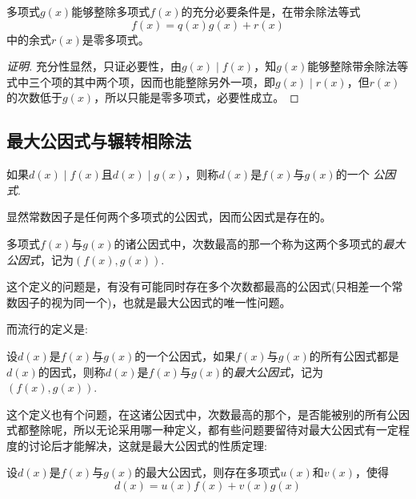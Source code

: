 \begin{theorem}
  多项式$g(x)$能够整除多项式$f(x)$的充分必要条件是，在带余除法等式
  \[ f(x)=q(x)g(x)+r(x) \]
  中的余式$r(x)$是零多项式。
\end{theorem}

\begin{proof}[证明]
  充分性显然，只证必要性，由$g(x) \mid f(x)$，知$g(x)$能够整除带余除法等式中三个项的其中两个项，因而也能整除另外一项，即$g(x) \mid r(x)$，但$r(x)$的次数低于$g(x)$，所以只能是零多项式，必要性成立。
\end{proof}

\subsection{最大公因式与辗转相除法}
\label{sec:greatest-common-divisor-and-euclidean-division}

\begin{definition}
  如果$d(x) \mid f(x)$且$d(x) \mid g(x)$，则称$d(x)$是$f(x)$与$g(x)$的一个 \emph{公因式}.
\end{definition}

显然常数因子是任何两个多项式的公因式，因而公因式是存在的。

\begin{definition}
  多项式$f(x)$与$g(x)$的诸公因式中，次数最高的那一个称为这两个多项式的\emph{最大公因式}，记为$(f(x),g(x))$.
\end{definition}

这个定义的问题是，有没有可能同时存在多个次数都最高的公因式(只相差一个常数因子的视为同一个)，也就是最大公因式的唯一性问题。

而流行的定义是:

\begin{definition}
  设$d(x)$是$f(x)$与$g(x)$的一个公因式，如果$f(x)$与$g(x)$的所有公因式都是$d(x)$的因式，则称$d(x)$是$f(x)$与$g(x)$的\emph{最大公因式}，记为$(f(x),g(x))$.
\end{definition}

这个定义也有个问题，在这诸公因式中，次数最高的那个，是否能被别的所有公因式都整除呢，所以无论采用哪一种定义，都有些问题要留待对最大公因式有一定程度的讨论后才能解决，这就是最大公因式的性质定理:

\begin{theorem}[最大公因式性质定理]
  \label{theorem:greatest-factor-polynome-property}
  设$d(x)$是$f(x)$与$g(x)$的最大公因式，则存在多项式$u(x)$和$v(x)$，使得
  \[ d(x) = u(x)f(x) + v(x)g(x) \]
\end{theorem}

